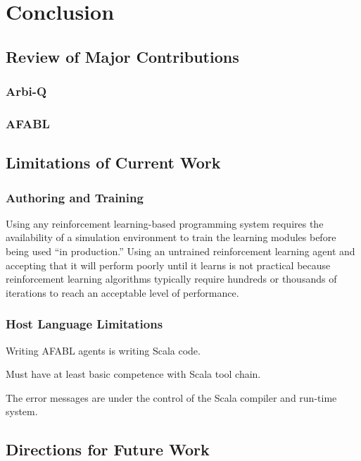 \chapter{Conclusion}\label{ch:conclusion}


\section{Review of Major Contributions}

\subsection{Arbi-Q}

\subsection{AFABL}

\section{Limitations of Current Work}

\subsection{Authoring and Training}

Using any reinforcement learning-based programming system requires the availability of a simulation environment to train the learning modules before being used ``in production.'' Using an untrained reinforcement learning agent and accepting that it will perform poorly until it learns is not practical because reinforcement learning algorithms typically require hundreds or thousands of iterations to reach an acceptable level of performance.

\subsection{Host Language Limitations}

Writing AFABL agents is writing Scala code.

Must have at least basic competence with Scala tool chain.

The error messages are under the control of the Scala compiler and run-time system.

\section{Directions for Future Work}

